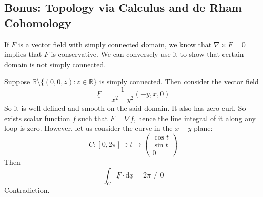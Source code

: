 \subsection{Bonus: Topology via Calculus and de Rham Cohomology}
If $\underline{F}$ is a vector field with simply connected domain, we know that $\nabla\times\underline{F}=0$ implies that $\underline{F}$ is conservative.
We can conversely use it to show that certain domain is not simply connected.
\begin{example}
    Suppose $\mathbb R\setminus\{(0,0,z):z\in\mathbb R\}$ is simply connected.
    Then consider the vector field
    $$\underline{F}=\frac{1}{x^2+y^2}(-y,x,0)$$
    So it is well defined and smooth on the said domain.
    It also has zero curl.
    So exists scalar function $f$ such that $\underline{F}=\nabla f$, hence the line integral of it along any loop is zero.
    However, let us consider the curve in the $x-y$ plane:
    $$C:[0,2\pi]\ni t\mapsto\begin{pmatrix}
        \cos t\\
        \sin t\\
        0
    \end{pmatrix}$$
    Then
    $$\int_C\underline{F}\cdot\mathrm d\underline{x}=2\pi\neq 0$$
    Contradiction.
\end{example}
